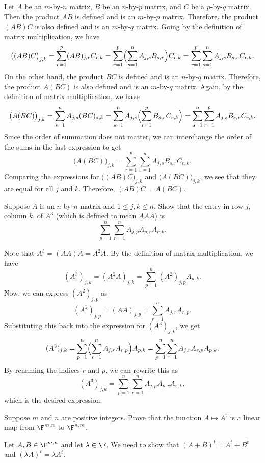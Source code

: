 \begin{exc}
\begin{solution}
Let $A$ be an $m$-by-$n$ matrix, $B$ be an $n$-by-$p$ matrix, and $C$ be a
$p$-by-$q$ matrix. Then the product $AB$ is defined and is an $m$-by-$p$
matrix. Therefore, the product $(AB)C$ is also defined and is an $m$-by-$q$
matrix. Going by the definition of matrix multiplication, we have
\[ \bigl((AB)C\bigr)_{j,k} = \sum_{r=1}^p (AB)_{j,r}C_{r,k}
   = \sum_{r=1}^p\Bigl(\sum_{s=1}^n A_{j,s}B_{s,r}\Bigr)C_{r,k}
   = \sum_{r=1}^p\sum_{s=1}^n A_{j,s}B_{s,r}C_{r,k}. \]
On the other hand, the product $BC$ is defined and is an $n$-by-$q$ matrix.
Therefore, the product $A(BC)$ is also defined and is an $m$-by-$q$ matrix.
Again, by the definition of matrix multiplication, we have
\[ \bigl(A(BC)\bigr)_{j,k} = \sum_{s=1}^n A_{j,s}(BC)_{s,k}
   = \sum_{s=1}^n A_{j,s}\Bigl(\sum_{r=1}^p B_{s,r}C_{r,k}\Bigr)
   = \sum_{s=1}^n\sum_{r=1}^p A_{j,s}B_{s,r}C_{r,k}. \]
Since the order of summation does not matter, we can interchange the order of
the sums in the last expression to get
\[ \bigl(A(BC)\bigr)_{j,k} = \sum_{r=1}^p\sum_{s=1}^n A_{j,s}B_{s,r}C_{r,k}. \]
Comparing the expressions for $\bigl((AB)C\bigr)_{j,k}$ and
$\bigl(A(BC)\bigr)_{j,k}$, we see that they are equal for all $j$ and $k$.
Therefore, $(AB)C=A(BC)$.
\end{solution}

\begin{exercise}
Suppose $A$ is an $n$-by-$n$ matrix and $1\le j,k\le n$. Show that the entry
in row $j$, column $k$, of $A^3$ (which is defined to mean $AAA$) is
\[ \sum_{p=1}^n\sum_{r=1}^n A_{j,p}A_{p,r}A_{r,k}. \]
\end{exercise}
\begin{solution}
Note that $A^3=(AA)A=A^2A$. By the definition of matrix multiplication, we have
\[ (A^3)_{j,k} = (A^2A)_{j,k} = \sum_{p=1}^n (A^2)_{j,p}A_{p,k}. \]
Now, we can express $(A^2)_{j,p}$ as
\[ (A^2)_{j,p} = (AA)_{j,p} = \sum_{r=1}^n A_{j,r}A_{r,p}. \]
Substituting this back into the expression for $(A^3)_{j,k}$, we get
\[ (A^3)_{j,k} = \sum_{p=1}^n\Bigl(\sum_{r=1}^n A_{j,r}A_{r,p}\Bigr)A_{p,k}
   = \sum_{p=1}^n\sum_{r=1}^n A_{j,r}A_{r,p}A_{p,k}. \]
By renaming the indices $r$ and $p$, we can rewrite this as
\[ (A^3)_{j,k} = \sum_{p=1}^n\sum_{r=1}^n A_{j,p}A_{p,r}A_{r,k}, \]
which is the desired expression.
\end{solution}

\begin{exercise}
Suppose $m$ and $n$ are positive integers. Prove that the function
$A\mapsto A^{\mathrm{t}}$ is a linear map from $\F^{m,n}$ to $\F^{n,m}$.
\end{exercise}
\begin{solution}
Let $A,B\in\F^{m,n}$ and let $\lambda\in\F$. We need to show that
$(A+B)^t=A^t+B^t$ and $(\lambda A)^t=\lambda A^t$.


\end{solution}
\end{exc}
